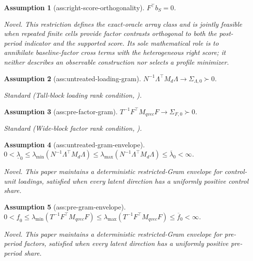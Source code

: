 \documentclass{article}
\newtheorem{assumption}{Assumption}
\begin{document}
\begin{assumption}[ass:right-score-orthogonality]\label{ass:right-score-orthogonality}
\(F^{\top}b_S=0\).
\par\smallskip\noindent\emph{Novel.} This restriction defines the exact-oracle array class and is jointly feasible when repeated finite cells provide factor contrasts orthogonal to both the post-period indicator and the supported score. Its sole mathematical role is to annihilate baseline-factor cross terms with the heterogeneous right score; it neither describes an observable construction nor selects a profile minimizer.
\end{assumption}

\begin{assumption}[ass:untreated-loading-gram]\label{ass:untreated-loading-gram}
\(N^{-1}\Lambda^{\top}M_d\Lambda\to\Sigma_{\Lambda,0}\succ0\).
\par\smallskip\noindent\emph{Standard} (Tall-block loading rank condition, \cite{BaiNg2021}).
\end{assumption}

\begin{assumption}[ass:pre-factor-gram]\label{ass:pre-factor-gram}
\(T^{-1}F^{\top}M_{qvec}F\to\Sigma_{F,0}\succ0\).
\par\smallskip\noindent\emph{Standard} (Wide-block factor rank condition, \cite{BaiNg2021}).
\end{assumption}

\begin{assumption}[ass:untreated-gram-envelope]\label{ass:untreated-gram-envelope}
\(0<\underline\lambda_0\le\lambda_{\min}(N^{-1}\Lambda^{\top}M_d\Lambda)\le\lambda_{\max}(N^{-1}\Lambda^{\top}M_d\Lambda)\le\overline\lambda_0<\infty\).
\par\smallskip\noindent\emph{Novel.} This paper maintains a deterministic restricted-Gram envelope for control-unit loadings, satisfied when every latent direction has a uniformly positive control share.
\end{assumption}

\begin{assumption}[ass:pre-gram-envelope]\label{ass:pre-gram-envelope}
\(0<\underline f_0\le\lambda_{\min}(T^{-1}F^{\top}M_{qvec}F)\le\lambda_{\max}(T^{-1}F^{\top}M_{qvec}F)\le\overline f_0<\infty\).
\par\smallskip\noindent\emph{Novel.} This paper maintains a deterministic restricted-Gram envelope for pre-period factors, satisfied when every latent direction has a uniformly positive pre-period share.
\end{assumption}
\end{document}
